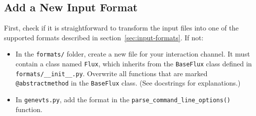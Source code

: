 \documentclass[11pt, oneside]{article}
\begin{document}
\subsection{Add a New Input Format}\label{sec:new-input-format}
First, check if it is straightforward to transform the input files into one of the supported formats described in section~\ref{sec:input-formats}.
If not:
\begin{itemize}
\item In the \texttt{formats/} folder, create a new file for your interaction channel. It must contain a class named \texttt{Flux}, which inherits from the \texttt{BaseFlux} class defined in \texttt{formats/\_\_init\_\_.py}. Overwrite all functions that are marked \texttt{@abstractmethod} in the \texttt{BaseFlux} class.
(See docstrings for explanations.)
\item In \texttt{genevts.py}, add the format in the \texttt{parse\_command\_line\_options()} function.
\end{itemize}


\clearpage
\footnotesize %


\end{document}
